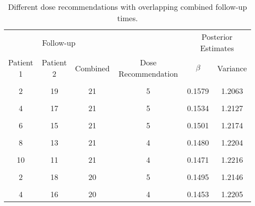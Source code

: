 \begin{table}[H]
	
	\caption{\label{tab_tite-dtp:TITEDTP_c2NNprob}Different dose recommendations with overlapping combined follow-up times.}
	\centering
	\fontsize{11}{13}\selectfont
	\begin{tabular}[t]{cccccc}
		\toprule
		\multicolumn{3}{c}{Follow-up} & \multicolumn{1}{c}{ } & \multicolumn{2}{c}{Posterior Estimates} \\
		\cmidrule(l{3pt}r{3pt}){1-3} \cmidrule(l{3pt}r{3pt}){5-6}
		Patient 1 & Patient 2 & Combined & Dose Recommendation & $\beta$ & Variance\\
		\midrule
		\cellcolor{gray!6}{1} & \cellcolor{gray!6}{20} & \cellcolor{gray!6}{21} & \cellcolor{gray!6}{5} & \cellcolor{gray!6}{0.1606} & \cellcolor{gray!6}{1.2024}\\
		2 & 19 & 21 & 5 & 0.1579 & 1.2063\\
		\cellcolor{gray!6}{3} & \cellcolor{gray!6}{18} & \cellcolor{gray!6}{21} & \cellcolor{gray!6}{5} & \cellcolor{gray!6}{0.1555} & \cellcolor{gray!6}{1.2097}\\
		4 & 17 & 21 & 5 & 0.1534 & 1.2127\\
		\cellcolor{gray!6}{5} & \cellcolor{gray!6}{16} & \cellcolor{gray!6}{21} & \cellcolor{gray!6}{5} & \cellcolor{gray!6}{0.1516} & \cellcolor{gray!6}{1.2153}\\
		6 & 15 & 21 & 5 & 0.1501 & 1.2174\\
		\cellcolor{gray!6}{7} & \cellcolor{gray!6}{14} & \cellcolor{gray!6}{21} & \cellcolor{gray!6}{4} & \cellcolor{gray!6}{0.1489} & \cellcolor{gray!6}{1.2191}\\
		8 & 13 & 21 & 4 & 0.1480 & 1.2204\\
		\cellcolor{gray!6}{9} & \cellcolor{gray!6}{12} & \cellcolor{gray!6}{21} & \cellcolor{gray!6}{4} & \cellcolor{gray!6}{0.1474} & \cellcolor{gray!6}{1.2212}\\
		10 & 11 & 21 & 4 & 0.1471 & 1.2216\\
		\cellcolor{gray!6}{1} & \cellcolor{gray!6}{19} & \cellcolor{gray!6}{20} & \cellcolor{gray!6}{5} & \cellcolor{gray!6}{0.1520} & \cellcolor{gray!6}{1.2110}\\
		2 & 18 & 20 & 5 & 0.1495 & 1.2146\\
		\cellcolor{gray!6}{3} & \cellcolor{gray!6}{17} & \cellcolor{gray!6}{20} & \cellcolor{gray!6}{4} & \cellcolor{gray!6}{0.1473} & \cellcolor{gray!6}{1.2178}\\
		4 & 16 & 20 & 4 & 0.1453 & 1.2205\\

\end{tabular}
\end{table}
